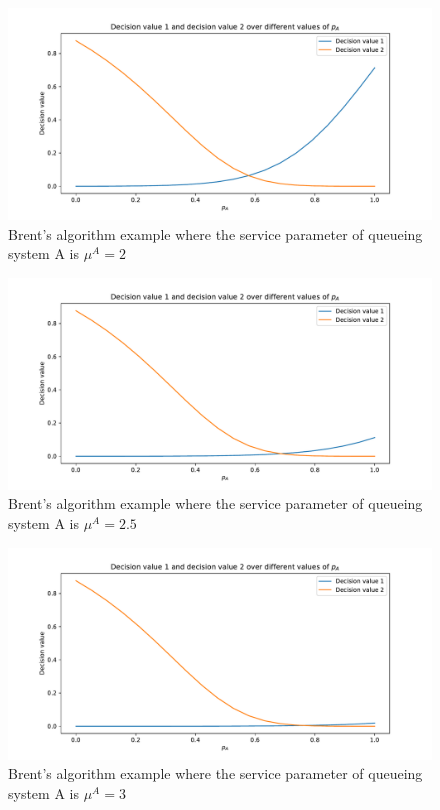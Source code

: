 \begin{figure}[H]
    \centering
    \includegraphics[width=\textwidth]{chapters/04_game_theoretic_model/Bin/brents_method/brent_method_example_mu_A_2.0.pdf}
    \caption{Brent's algorithm example where the service parameter of queueing
    system A is \(\mu^A = 2\)}
    \label{fig:brent_method_example_mu_A_3}
\end{figure}

\begin{figure}[H]
    \centering
    \includegraphics[width=\textwidth]{chapters/04_game_theoretic_model/Bin/brents_method/brent_method_example_mu_A_2.5.pdf}
    \caption{Brent's algorithm example where the service parameter of queueing
    system A is \(\mu^A = 2.5\)}
    \label{fig:brent_method_example_mu_A_4}
\end{figure}

\begin{figure}[H]
    \centering
    \includegraphics[width=\textwidth]{chapters/04_game_theoretic_model/Bin/brents_method/brent_method_example_mu_A_3.0.pdf}
    \caption{Brent's algorithm example where the service parameter of queueing
    system A is \(\mu^A = 3\)}
    \label{fig:brent_method_example_mu_A_5}
\end{figure}

